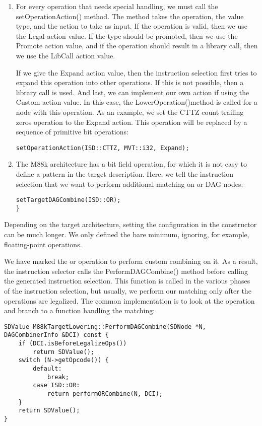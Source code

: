 \begin{enumerate}
\item For every operation that needs special handling, we must call the setOperationAction() method. The method takes the operation, the value type, and the action to take as input. If the operation is valid, then we use the Legal action value. If the type should be promoted, then we use the Promote action value, and if the operation should result in a library call, then we use the LibCall action value.\par
If we give the Expand action value, then the instruction selection first tries to expand this operation into other operations. If this is not possible, then a library call is used. And last, we can implement our own action if using the Custom action value. In this case, the LowerOperation()method is called for a node with this operation. As an example, we set the CTTZ count trailing zeros operation to the Expand action. This operation will be replaced by a sequence of primitive bit operations:
\begin{lstlisting}[caption={}]
	setOperationAction(ISD::CTTZ, MVT::i32, Expand);
\end{lstlisting}

\item The M88k architecture has a bit field operation, for which it is not easy to define a pattern in the target description. Here, we tell the instruction selection that we want to perform additional matching on or DAG nodes:
\begin{lstlisting}[caption={}]
	setTargetDAGCombine(ISD::OR);
}
\end{lstlisting}

\end{enumerate}

Depending on the target architecture, setting the configuration in the constructor can be much longer. We only defined the bare minimum, ignoring, for example, floating-point operations.\par

We have marked the or operation to perform custom combining on it. As a result, the instruction selector calls the PerformDAGCombine() method before calling the generated instruction selection. This function is called in the various phases of the instruction selection, but usually, we perform our matching only after the operations are legalized. The common implementation is to look at the operation and branch to a function handling the matching:\par

\begin{lstlisting}[caption={}]
SDValue M88kTargetLowering::PerformDAGCombine(SDNode *N,
DAGCombinerInfo &DCI) const {
	if (DCI.isBeforeLegalizeOps())
		return SDValue();
	switch (N->getOpcode()) {
		default:
			break;
		case ISD::OR:
			return performORCombine(N, DCI);
	}
	return SDValue();
}
\end{lstlisting}

